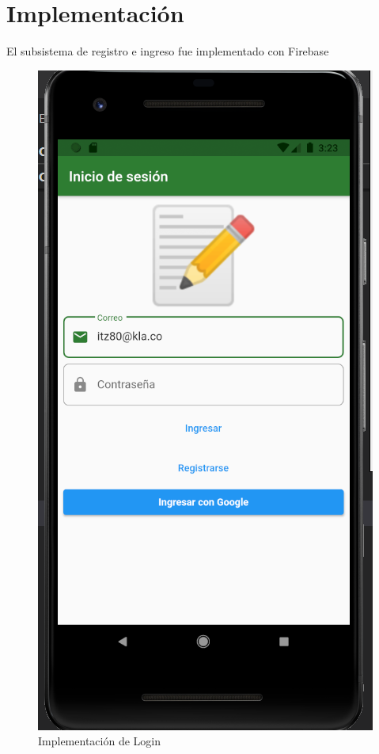 \documentclass{article}
\begin{document}
\section{Implementación}
El subsistema de registro e ingreso fue implementado con Firebase 
\begin{figure}[H]
    \centering
    \includegraphics[scale=0.8]{imgs/Imp/Login1}
    \caption{Implementación de Login}
\end{figure}
\end{document}
